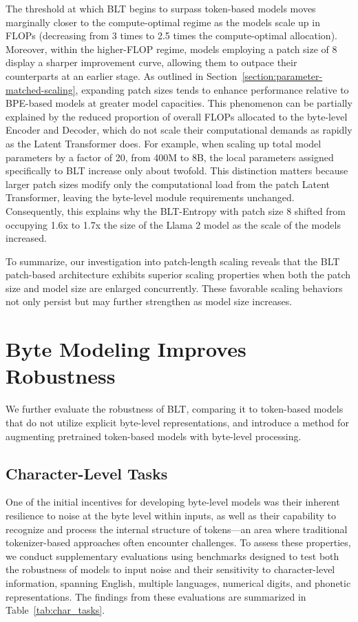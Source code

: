 The threshold at which {\textsc BLT} begins to surpass token-based models moves marginally closer to the compute-optimal regime as the models scale up in FLOPs (decreasing from 3 times to 2.5 times the compute-optimal allocation). Moreover, within the higher-FLOP regime, models employing a patch size of 8 display a sharper improvement curve, allowing them to outpace their counterparts at an earlier stage. As outlined in Section~\ref{section:parameter-matched-scaling}, expanding patch sizes tends to enhance performance relative to BPE-based models at greater model capacities. This phenomenon can be partially explained by the reduced proportion of overall FLOPs allocated to the byte-level Encoder and Decoder, which do not scale their computational demands as rapidly as the Latent Transformer does. For example, when scaling up total model parameters by a factor of 20, from 400M to 8B, the local parameters assigned specifically to {\textsc BLT} increase only about twofold. This distinction matters because larger patch sizes modify only the computational load from the patch Latent Transformer, leaving the byte-level module requirements unchanged. Consequently, this explains why the {\textsc BLT}-Entropy with patch size 8 shifted from occupying 1.6x to 1.7x the size of the Llama 2 model as the scale of the models increased.

To summarize, our investigation into patch-length scaling reveals that the {\textsc BLT} patch-based architecture exhibits superior scaling properties when both the patch size and model size are enlarged concurrently. These favorable scaling behaviors not only persist but may further strengthen as model size increases.

\section{Byte Modeling Improves Robustness} We further evaluate the robustness of {\textsc BLT}, comparing it to token-based models that do not utilize explicit byte-level representations, and introduce a method for augmenting pretrained token-based models with byte-level processing.
\label{sec:robustness}

\subsection{Character-Level Tasks}

One of the initial incentives for developing byte-level models was their inherent resilience to noise at the byte level within inputs, as well as their capability to recognize and process the internal structure of tokens—an area where traditional tokenizer-based approaches often encounter challenges. To assess these properties, we conduct supplementary evaluations using benchmarks designed to test both the robustness of models to input noise and their sensitivity to character-level information, spanning English, multiple languages, numerical digits, and phonetic representations. The findings from these evaluations are summarized in Table~\ref{tab:char_tasks}.

